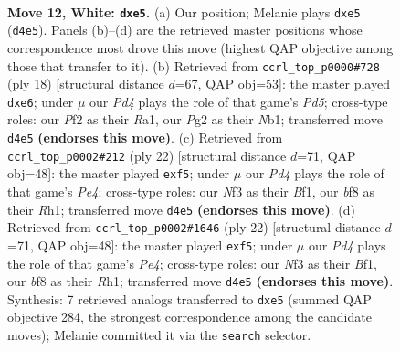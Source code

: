 \documentclass[11pt]{article}
\begin{document}
\clearpage

\begin{figure}[p]\centering
\begin{subfigure}{0.46\textwidth}\centering
\resizebox{\linewidth}{!}{%
\newchessgame
\chessboard[
  setfen={r1bqkb1r/pp3ppp/2n5/3pp3/3P3P/5N2/PP3PPK/RNBQ1R2 w q - 0 12},
  showmover=false,
  pgfstyle=straightmove, color=movearrow, markmove={d4-e5}
]}
\caption{}
\end{subfigure}\hfill
\begin{subfigure}{0.46\textwidth}\centering
\resizebox{\linewidth}{!}{%
\newchessgame
\chessboard[
  setfen={r1bqk2r/pp1n1ppp/4p3/2bPP3/8/4PN2/PP4PP/RN1QKB1R w KQkq - 0 10},
  showmover=false,
  pgfstyle=straightmove, color=movearrow, markmove={d5-e6}
]}
\caption{}
\end{subfigure}
\\[4pt]
\begin{subfigure}{0.46\textwidth}\centering
\resizebox{\linewidth}{!}{%
\newchessgame
\chessboard[
  setfen={r1bqkb1r/5p1p/p1np4/1p1Npp2/4P3/N7/PPP2PPP/R2QKB1R w KQkq - 0 12},
  showmover=false,
  pgfstyle=straightmove, color=movearrow, markmove={e4-f5}
]}
\caption{}
\end{subfigure}\hfill
\begin{subfigure}{0.46\textwidth}\centering
\resizebox{\linewidth}{!}{%
\newchessgame
\chessboard[
  setfen={r1bqkb1r/5p1p/p1np4/1p1Npp2/4P3/N7/PPP2PPP/R2QKB1R w KQkq - 0 12},
  showmover=false,
  pgfstyle=straightmove, color=movearrow, markmove={e4-f5}
]}
\caption{}
\end{subfigure}
\caption{\textbf{Move 12, White: \texttt{dxe5}.} (a) Our position; Melanie plays \texttt{dxe5} (\texttt{d4e5}). Panels (b)--(d) are the retrieved master positions whose correspondence most drove this move (highest QAP objective among those that transfer to it). (b) Retrieved from \texttt{ccrl\_top\_p0000\#728} (ply 18) [structural distance $d$=67, QAP obj=53]: the master played \texttt{dxe6}; under $\mu$ our \emph{Pd4} plays the role of that game's \emph{Pd5}; cross-type roles: our \emph{P}f2 as their \emph{R}a1, our \emph{P}g2 as their \emph{N}b1; transferred move \texttt{d4e5} \textbf{(endorses this move)}. (c) Retrieved from \texttt{ccrl\_top\_p0002\#212} (ply 22) [structural distance $d$=71, QAP obj=48]: the master played \texttt{exf5}; under $\mu$ our \emph{Pd4} plays the role of that game's \emph{Pe4}; cross-type roles: our \emph{N}f3 as their \emph{B}f1, our \emph{b}f8 as their \emph{R}h1; transferred move \texttt{d4e5} \textbf{(endorses this move)}. (d) Retrieved from \texttt{ccrl\_top\_p0002\#1646} (ply 22) [structural distance $d$=71, QAP obj=48]: the master played \texttt{exf5}; under $\mu$ our \emph{Pd4} plays the role of that game's \emph{Pe4}; cross-type roles: our \emph{N}f3 as their \emph{B}f1, our \emph{b}f8 as their \emph{R}h1; transferred move \texttt{d4e5} \textbf{(endorses this move)}. Synthesis: 7 retrieved analogs transferred to \texttt{dxe5} (summed QAP objective 284, the strongest correspondence among the candidate moves); Melanie committed it via the \texttt{search} selector.}
\label{fig:thought-m22}
\end{figure}
\end{document}
